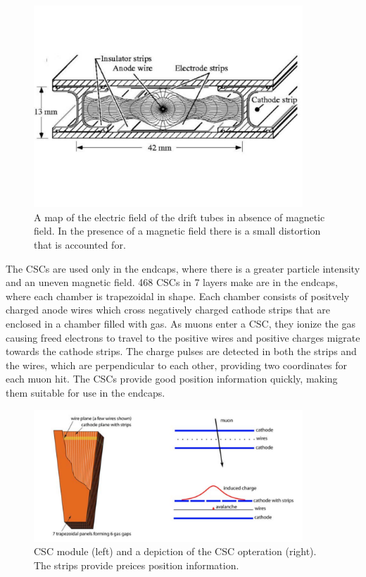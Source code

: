 \begin{figure}[hbtp]
 \begin{center}
   \includegraphics[width=0.9\textwidth]{ch3_figs/cms_dt.pdf}
   \caption{A map of the electric field of the drift tubes in absence of magnetic field. In the presence of a magnetic field there is a small distortion that is accounted for.}
   \label{fig:cms_dt}
 \end{center}
\end{figure}

The CSCs are used only in the endcaps, where there is a greater particle intensity and an uneven magnetic field. 468 CSCs in 7 layers make are in the endcaps, where each chamber is trapezoidal in shape.
Each chamber consists of positvely charged anode wires which cross negatively charged cathode strips that are enclosed in a chamber filled with gas. As muons enter a
CSC, they ionize the gas causing freed electrons to travel to the positive wires and positive charges migrate towards the cathode strips. The charge pulses are detected in both the strips
and the wires, which are perpendicular to each other, providing two coordinates for each muon hit. The CSCs provide good position information quickly, making them suitable for use in the endcaps. 

\begin{figure}[hbtp]
 \begin{center}
   \includegraphics[width=0.9\textwidth]{ch3_figs/cms_csc.pdf}
   \caption[CSC module and operation schematic]{CSC module (left) and a depiction of the CSC opteration (right). The strips provide preices position information.}
   \label{fig:cms_csc}
 \end{center}
\end{figure}

